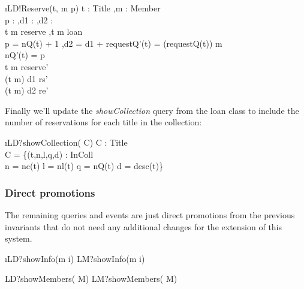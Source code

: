 \documentclass[12pt,a4paper]{article}
\begin{document}
\begin{showspecs}
	\begin{spec}{\i{LD!Reserve(t, m \to p)}}
		t : Title \sep m : Member \\
		p :  \sep d1 :  \sep d2 :  \\
		t \mapsto m \notin reserve \sep t \mapsto m \notin loan \\
		p = nQ(t) + 1 \sep d2 = d1 + 
	\post
		requestQ'(t) = (requestQ(t)) \langle m \rangle \\
		nQ'(t) = p\\
		t \mapsto m \in reserve'\\
		(t \mapsto m) \mapsto d1 \in rs'\\
		(t \mapsto m) \mapsto d2 \in re'
	\end{spec}
\end{showspecs}	

\medskip\noindent Finally we'll update the \emph{showCollection} query from the loan class to include the number of reservations for each title in the collection:
		
\begin{showspecs}
	\begin{spec}{\i{LD?showCollection( \to C)}}
		C : Title \nrightarrow {} \times {} \nrightarrow {} \times {}\\
		C = \{(t,n,l,q,d) : InColl \times {} \times {} \times {} \times {} \hspace{.1cm}\bullet\\
			\hspace{1.5cm} n = nc(t) \wedge l = nl(t) \wedge q = nQ(t) \wedge d = desc(t)\}
	\end{spec}
\end{showspecs}	
		

\subsubsection*{Direct promotions}
		
\medskip\noindent The remaining queries and events are just direct promotions from the previous invariants that do not need any additional changes for the extension of this system.
		
\begin{showspecs}
	\begin{spec}{\i{LD?showInfo(m \to i)}}
		LM?showInfo(m \to i)
	\end{spec}

	\showbeside
	
	\begin{spec}{LD?showMembers( \to M)}
		LM?showMembers( \to M)
	\end{spec}

\end{showspecs}
\end{document}
